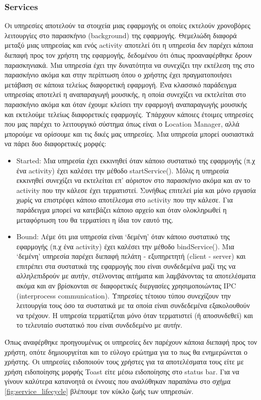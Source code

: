 		\subsubsection{Services}
		Οι υπηρεσίες αποτελούν τα στοιχεία μιας εφαρμογής οι οποίες εκτελούν χρονοβόρες λειτουργίες στο παρασκήνιο (background) της εφαρμογής. Θεμελιώδη διαφορά μεταξύ μιας υπηρεσίας και ενός activity αποτελεί ότι η υπηρεσία δεν παρέχει κάποια διεπαφή προς τον χρήστη της εφαρμογής, δεδομένου ότι όπως προαναφέρθηκε δρουν παρασκηνιακά. Μια υπηρεσία έχει την δυνατότητα να συνεχίζει την εκτέλεση της στο παρασκήνιο ακόμα και στην περίπτωση όπου ο χρήστης έχει πραγματοποιήσει μετάβαση σε κάποια τελείως διαφορετική εφαρμογή. Ένα κλασσικό παράδειγμα υπηρεσίας αποτελεί η αναπαραγωγή μουσικής, η οποία συνεχίζει να εκτελείται στο παρασκήνιο ακόμα και όταν έχουμε κλείσει την εφαρμογή αναπαραγωγής μουσικής και εκτελούμε τελείως διαφορετικές εφαρμογές. Υπάρχουν κάποιες έτοιμες υπηρεσίες που μας παρέχει το λειτουργικό σύστημα όπως είναι ο Location Manager, αλλά μπορούμε να ορίσουμε και τις δικές μας υπηρεσίες. Μια υπηρεσία μπορεί ουσιαστικά να πάρει δυο διαφορετικές μορφές\cite{servicesAndroid}:
		\begin{itemize}
			\item Started: Μια υπηρεσία έχει εκκινηθεί όταν κάποιο συστατικό της εφαρμογής (π.χ ένα activity) έχει καλέσει την μέθοδο startService(). Μόλις η υπηρεσία εκκινηθεί συνεχίζει να εκτελείται επ' αόριστον στο παρασκήνιο ακόμα και αν το activity που την κάλεσε έχει τερματιστεί. Συνήθως επιτελεί μία και μόνο εργασία χωρίς να επιστρέφει κάποιο αποτέλεσμα στο activity που την κάλεσε. Για παράδειγμα μπορεί να κατεβάζει κάποιο αρχείο και όταν ολοκληρωθεί η μεταφόρτωση του θα τερματίσει η ίδια τον εαυτό της.
			\item Bound: Λέμε ότι μια υπηρεσία είναι `δεμένη' όταν κάποιο συστατικό της εφαρμογής (π.χ ένα activity) έχει καλέσει την μέθοδο bindService(). Μια `δεμένη' υπηρεσία παρέχει διεπαφή πελάτη - εξυπηρετητή (client - server) και επιτρέπει στα συστατικά της εφαρμογής που είναι συνδεδεμένα μαζί της να αλληλεπιδρούν με αυτήν, στέλνοντας αιτήματα και λαμβάνοντας τα αποτελέσματα ακόμα και αν βρίσκονται σε διαφορετικές διεργασίες χρησιμοποιώντας IPC (interprocess communication). Υπηρεσίες τέτοιου τύπου συνεχίζουν την λειτουργία τους όσο τα συστατικά με τα οποία είναι συνδεδεμένα εξακολουθούν να τρέχουν. Η υπηρεσία τερματίζεται μόνο όταν τερματιστεί (ή αποσυνδεθεί) και το τελευταίο συστατικό που είναι συνδεδεμένο με αυτήν.
		\end{itemize}
		Όπως αναφέρθηκε προηγουμένως οι υπηρεσίες δεν παρέχουν κάποια διεπαφή προς τον χρήστη, οπότε δημιουργείται και το εύλογο ερώτημα για το πως θα ενημερώνεται ο χρήστης. Οι υπηρεσίες ειδοποιούν τους χρήστες για τα αποτελέσματα τους είτε με χρήση ειδοποίησης μορφής Toast είτε μέσω ειδοποίησης στο status bar.  Για να γίνουν καλύτερα κατανοητά οι έννοιες που αναλύθηκαν παραπάνω στο σχήμα \ref{fig:service_lifecycle} βλέπουμε τον κύκλο ζωής των υπηρεσιών.
		
